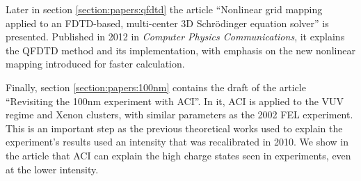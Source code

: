 









Later in section \ref{section:papers:qfdtd} the article ``Nonlinear grid mapping
applied to an FDTD-based, multi-center 3D Schr\"odinger equation solver'' is
presented. Published in 2012 in \textit{Computer Physics Communications}, it
explains the QFDTD method and its implementation, with emphasis on the new
nonlinear mapping introduced for faster calculation.

Finally, section \ref{section:papers:100nm} contains the draft of the article
``Revisiting the 100nm experiment with ACI''. In it, ACI is
applied to the VUV regime and Xenon clusters, with similar parameters as the 2002
FEL experiment. This is an important step as the previous theoretical works
used to explain the experiment's results used an intensity that was
recalibrated in 2010. We show in the article that ACI can explain the high
charge states seen in experiments, even at the lower intensity.





